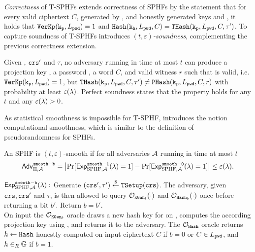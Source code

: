 \emph{Correctness} of T-SPHFs extends correctness of SPHFs by the statement that for every valid ciphertext $C$, generated by \cL, and honestly generated keys \hk and \hp, it holds that $\mathtt{VerKp}(\mathtt{k_p}, L_\mathtt{pwd})=1$ and $\mathtt{Hash}(\mathtt{k_h}, L_\mathtt{pwd}, C)=\mathtt{THash}(\mathtt{k_p}, L_\mathtt{pwd}, C, \tau')$.
To capture soundness of T-SPHFs \cite{Benhamouda2013} introduces \emph{$(t,\varepsilon)$-soundness}, complementing the previous correctness extension.

\begin{definition}
Given \crs, $\mathtt{crs}'$ and $\tau$, no adversary running in time at most $t$ can produce a projection key \hp, a password \pwd, a word $C$, and valid witness $r$ such that \hp is valid, i.e. $\mathtt{VerKp}(\mathtt{k_p},L_\mathtt{pwd})=1$, but $\mathtt{THash}(\mathtt{k_p},L_\mathtt{pwd},C,\tau')\not=\mathtt{PHash}(\mathtt{k_p},L_\mathtt{pwd},C,r)$ with probability at least $\varepsilon(\lambda)$.
Perfect soundness states that the property holds for any $t$ and any $\varepsilon(\lambda)>0$.
\end{definition} 

\noindent
As statistical smoothness is impossible for T-SPHF, \cite{Benhamouda2013} introduces the notion computational smoothness, which is similar to the definition of pseudorandomness for SPHFs.

\begin{definition}
An SPHF is $(t,\varepsilon)$-smooth if for all adversaries $\mathcal{A}$ running in time at most $t$
\[ \mathsf{Adv}_{\Pi, \mathcal{A}}^{\mathtt{smooth-b}} = \left|\Pr[\mathsf{Exp}^{\mathtt{smooth-1}}_{\text{SPHF},\mathcal{A}}(\lambda)=1] - \Pr[\mathsf{Exp}^{\mathtt{smooth-0}}_{\text{SPHF},\mathcal{A}}(\lambda)=1]\right| \leq \varepsilon(\lambda).\]

\noindent
$\mathsf{Exp}^{\mathtt{smooth-b}}_{\text{SPHF},\mathcal{A}}(\lambda):$ Generate $(\mathtt{crs}',\tau')\stackrel{\$}{\gets}\mathtt{TSetup}(\mathtt{crs})$.
The adversary, given $\mathtt{crs}, \mathtt{crs}'$ and $\tau$, is then allowed to query $\mathcal{O}_{\mathtt{KGen_P}}(\cdot)$ and $\mathcal{O}_{\mathtt{Hash}_b}(\cdot)$ once before returning a bit $b'$.
Return $b=b'$.\\

\noindent
On input \pwd the $\mathcal{O}_{\mathtt{KGen_P}}$ oracle draws a new hash key \hk for \TSPHF on \Lpwd, computes the according projection key \hp using \PKGen, and returns it to the adversary.
The $\mathcal{O}_{\mathtt{Hash}}$ oracle returns $h\gets \mathtt{Hash}$ honestly computed on input ciphertext $C$ if $b=0$ or $C\in L_\mathtt{pwd}$, and $h\in_R \mathbb{G}$ if $b=1$.\\
\end{definition}


